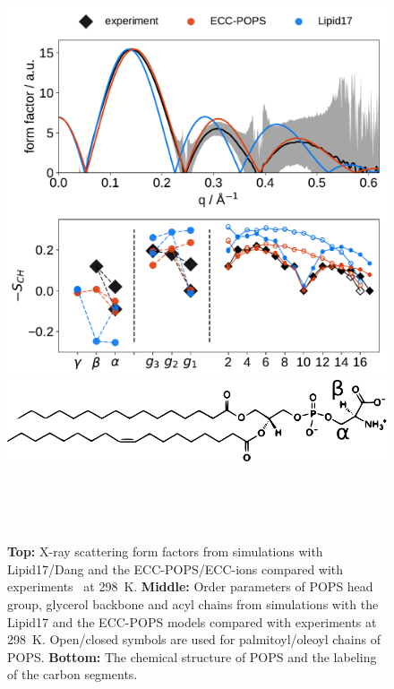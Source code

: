 \documentclass[journal=jpcbfk,manuscript=article]{achemso}
\newlength{\figwidth}
\begin{document}
\begin{figure}[tb!] 
  \centering 
  \includegraphics[width=\figwidth]{../img/ecc_pops/Order-parameters_form-factors_exp-L17-ECC-lipids.pdf}
  \includegraphics[width=\figwidth]{../img/ecc_pops/pops_chemfig.pdf} 
\hfill
  \caption{\label{simVSexpNOions_POPS} 
    \textbf{Top:} X-ray scattering form factors from simulations with Lipid17/Dang \citep{lipid17-future, dang2006} and 
    the ECC-POPS/ECC-ions \cite{martinek17, Pluhackova2016} compared with experiments~\citep{kucerka14} at 298~K. 
    \textbf{Middle:} Order parameters of POPS head group, glycerol backbone and acyl chains  
    from simulations with the Lipid17 \citep{lipid17-future} and the ECC-POPS models 
    compared with experiments at 298~K. \citep{NMRlipidsIV}
    Open/closed symbols are used for palmitoyl/oleoyl chains of POPS. 
    \textbf{Bottom:} The chemical structure of POPS and the labeling of the carbon segments. 
  }  
   \\
   \\
   \\
\end{figure} 
\end{document}
